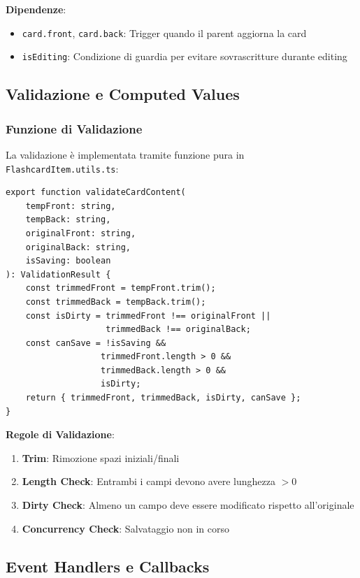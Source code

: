 \documentclass[11pt,a4paper]{article}
\begin{document}
\textbf{Dipendenze}: 
\begin{itemize}
    \item \texttt{card.front}, \texttt{card.back}: Trigger quando il parent aggiorna la card
    \item \texttt{isEditing}: Condizione di guardia per evitare sovrascritture durante editing
\end{itemize}

\subsection{Validazione e Computed Values}

\subsubsection{Funzione di Validazione}

La validazione è implementata tramite funzione pura in \texttt{FlashcardItem.utils.ts}:

\begin{lstlisting}[style=typescript, caption=Validazione Contenuto]
export function validateCardContent(
    tempFront: string,
    tempBack: string,
    originalFront: string,
    originalBack: string,
    isSaving: boolean
): ValidationResult {
    const trimmedFront = tempFront.trim();
    const trimmedBack = tempBack.trim();
    const isDirty = trimmedFront !== originalFront || 
                    trimmedBack !== originalBack;
    const canSave = !isSaving && 
                   trimmedFront.length > 0 && 
                   trimmedBack.length > 0 && 
                   isDirty;
    return { trimmedFront, trimmedBack, isDirty, canSave };
}
\end{lstlisting}

\textbf{Regole di Validazione}:
\begin{enumerate}
    \item \textbf{Trim}: Rimozione spazi iniziali/finali
    \item \textbf{Length Check}: Entrambi i campi devono avere lunghezza $> 0$
    \item \textbf{Dirty Check}: Almeno un campo deve essere modificato rispetto all'originale
    \item \textbf{Concurrency Check}: Salvataggio non in corso
\end{enumerate}

\subsection{Event Handlers e Callbacks}
\end{document}
